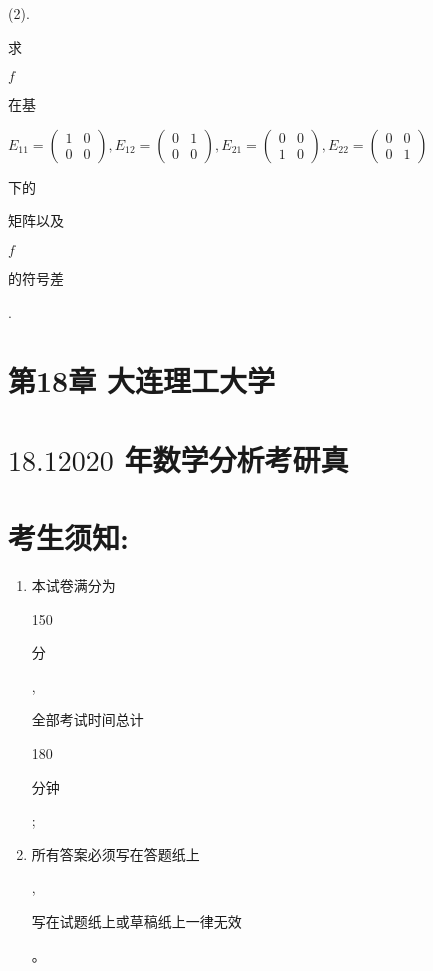 \documentclass[10pt]{article}
\begin{document}
(2). \begin{CJK}{UTF8}{mj}求\end{CJK} $f$ \begin{CJK}{UTF8}{mj}在基\end{CJK} $E_{11}=\left(\begin{array}{ll}1 & 0 \\ 0 & 0\end{array}\right), E_{12}=\left(\begin{array}{ll}0 & 1 \\ 0 & 0\end{array}\right), E_{21}=\left(\begin{array}{ll}0 & 0 \\ 1 & 0\end{array}\right), E_{22}=\left(\begin{array}{ll}0 & 0 \\ 0 & 1\end{array}\right)$ \begin{CJK}{UTF8}{mj}下的\end{CJK} \begin{CJK}{UTF8}{mj}矩阵以及\end{CJK} $f$ \begin{CJK}{UTF8}{mj}的符号差\end{CJK}.

\section{第18章 大连理工大学}
\section{$18.12020$ 年数学分析考研真}
\section{考生须知:}
\begin{enumerate}
  \item \begin{CJK}{UTF8}{mj}本试卷满分为\end{CJK} 150 \begin{CJK}{UTF8}{mj}分\end{CJK}, \begin{CJK}{UTF8}{mj}全部考试时间总计\end{CJK} 180 \begin{CJK}{UTF8}{mj}分钟\end{CJK};

  \item \begin{CJK}{UTF8}{mj}所有答案必须写在答题纸上\end{CJK}, \begin{CJK}{UTF8}{mj}写在试题纸上或草稿纸上一律无效\end{CJK}。

\end{enumerate}
\end{document}

